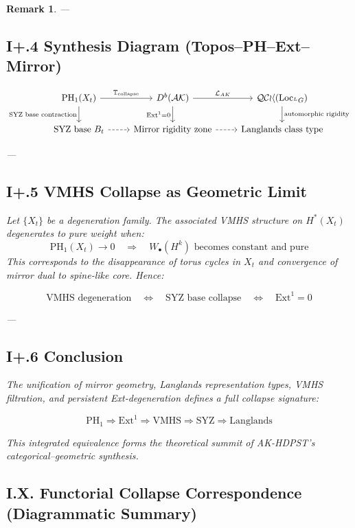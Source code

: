 \documentclass[11pt]{article}
\newtheorem{remark}[theorem]{Remark}
\begin{document}
\begin{remark}
---

\subsection*{I+.4 Synthesis Diagram (Topos–PH–Ext–Mirror)}

\[
\begin{tikzcd}
\mathrm{PH}_1(X_t) \arrow[r, "\mathbb{T}_{\text{collapse}}"] \arrow[d, "\text{SYZ base contraction}"'] &
D^b(\mathcal{AK}) \arrow[r, "\mathcal{L}_{AK}"] \arrow[d, "\mathrm{Ext}^1 = 0"'] &
\mathcal{QCoh}(\mathrm{Loc}_{^LG}) \arrow[d, "\text{automorphic rigidity}"] \\
\text{SYZ base } B_t \arrow[r, dashed] &
\text{Mirror rigidity zone} \arrow[r, dashed] &
\text{Langlands class type}
\end{tikzcd}
\]

---

\subsection*{I+.5 VMHS Collapse as Geometric Limit}

Let \( \{X_t\} \) be a degeneration family. The associated VMHS structure on \( H^*(X_t) \) degenerates to pure weight when:
\[
\mathrm{PH}_1(X_t) \to 0 \quad \Rightarrow \quad W_\bullet(H^k) \text{ becomes constant and pure}
\]
This corresponds to the disappearance of torus cycles in \( X_t \) and convergence of mirror dual to spine-like core. Hence:

\[
\text{VMHS degeneration} \quad \Leftrightarrow \quad \text{SYZ base collapse} \quad \Leftrightarrow \quad \mathrm{Ext}^1 = 0
\]

---

\subsection*{I+.6 Conclusion}

The unification of mirror geometry, Langlands representation types, VMHS filtration, and persistent Ext-degeneration defines a full collapse signature:

\[
\boxed{
\mathrm{PH}_1 \Rightarrow \mathrm{Ext}^1 \Rightarrow \text{VMHS} \Rightarrow \text{SYZ} \Rightarrow \text{Langlands}
}
\]

This integrated equivalence forms the theoretical summit of AK-HDPST's categorical–geometric synthesis.

\subsection*{I.X. Functorial Collapse Correspondence (Diagrammatic Summary)}


\end{remark}
\end{document}
